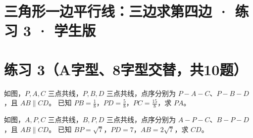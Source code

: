 \documentclass{exam-zh}
\begin{document}
\section*{三角形一边平行线：三边求第四边 · 练习 3 · 学生版}

\section*{练习 3（A字型、8字型交替，共10题）}


\begin{problem}[points=10]
  \noindent
  \begin{minipage}[t]{\dimexpr\linewidth-60mm-6mm\relax}
    \vspace{0pt}
    如图，$P,A,C$ 三点共线，$P,B,D$ 三点共线，点序分别为 $P-A-C$、$P-B-D$，且 $AB\parallel CD$。
已知 $PB=\frac{1}{8}$，$PD=\frac{5}{8}$，$PC=\frac{15}{8}$，求 $PA$。
    
  \end{minipage}\hfill
  \begin{diagramcoltikz}{60mm}{先看平行边方向，再判断 A 字型或 8 字型及对应边。}
  }
  \end{diagramcoltikz}
  \par\medskip
  \answerarea[42mm]
\end{problem}



\begin{problem}[points=10]
  \noindent
  \begin{minipage}[t]{\dimexpr\linewidth-60mm-6mm\relax}
    \vspace{0pt}
    如图，$A,P,C$ 三点共线，$B,P,D$ 三点共线，点序分别为 $A-P-C$、$B-P-D$，且 $AB\parallel CD$。
已知 $BP=\sqrt{7}$，$PD=7$，$AB=2\sqrt{7}$，求 $CD$。
    
  \end{minipage}\hfill
  \begin{diagramcoltikz}{60mm}{先看平行边方向，再判断 A 字型或 8 字型及对应边。}
  }
  \end{diagramcoltikz}
  \par\medskip
  \answerarea[42mm]
\end{problem}
\end{document}

